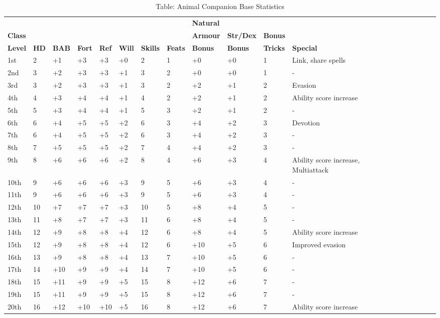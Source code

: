 
\begin{table*}[]
\sffamily
\caption{Table: Animal Companion Base Statistics}
\setlength{\tabcolsep}{1pt}
\begin{tabular}{llllllllllllllllllll}
      &    &     &      &     &      &        &       & \textbf{Natural} &         &        & \\
\textbf{Class} &    &     &      &     &      &        &       & \textbf{Armour}  & \textbf{Str/Dex} & \textbf{Bonus}  & \\
\textbf{Level} & \textbf{HD} & \textbf{BAB} & \textbf{Fort} & \textbf{Ref} & \textbf{Will} & \textbf{Skills} & \textbf{Feats} & \textbf{Bonus} & \textbf{Bonus}   & \textbf{Tricks} & \textbf{Special} \\
1st & 2 & +1 & +3 & +3 & +0 & 2 & 1 & +0 & +0 & 1 & Link, share spells \\
2nd & 3 & +2 & +3 & +3 & +1 & 3 & 2 & +0 & +0 & 1 & - \\
3rd & 3 & +2 & +3 & +3 & +1 & 3 & 2 & +2 & +1 & 2 & Evasion \\
4th & 4 & +3 & +4 & +4 & +1 & 4 & 2 & +2 & +1 & 2 & Ability score increase \\
 5th & 5 & +3 & +4 & +4 & +1 & 5 & 3 & +2 & +1 & 2 & - \\
 6th & 6 & +4 & +5 & +5 & +2 & 6 & 3 & +4 & +2 & 3 & Devotion \\
 7th & 6 & +4 & +5 & +5 & +2 & 6 & 3 & +4 & +2 & 3 & - \\
 8th & 7 & +5 & +5 & +5 & +2 & 7 & 4 & +4 & +2 & 3 & - \\
 9th & 8 & +6 & +6 & +6 & +2 & 8 & 4 & +6 & +3 & 4 & Ability score increase, Multiattack \\
 10th & 9 & +6 & +6 & +6 & +3 & 9 & 5 & +6 & +3 & 4 & - \\
 11th & 9 & +6 & +6 & +6 & +3 & 9 & 5 & +6 & +3 & 4 & - \\
 12th & 10 & +7 & +7 & +7 & +3 & 10 & 5 & +8 & +4 & 5 & - \\
 13th & 11 & +8 & +7 & +7 & +3 & 11 & 6 & +8 & +4 & 5 & - \\
 14th & 12 & +9 & +8 & +8 & +4 & 12 & 6 & +8 & +4 & 5 & Ability score increase \\
 15th & 12 & +9 & +8 & +8 & +4 & 12 & 6 & +10 & +5 & 6 & Improved evasion \\
 16th & 13 & +9 & +8 & +8 & +4 & 13 & 7 & +10 & +5 & 6 & - \\
 17th & 14 & +10 & +9 & +9 & +4 & 14 & 7 & +10 & +5 & 6 & - \\
 18th & 15 & +11 & +9 & +9 & +5 & 15 & 8 & +12 & +6 & 7 & - \\
 19th & 15 & +11 & +9 & +9 & +5 & 15 & 8 & +12 & +6 & 7 & - \\
 20th & 16 & +12 & +10 & +10 & +5 & 16 & 8 & +12 & +6 & 7 & Ability score increase\\
\end{tabular}
\end{table*}

